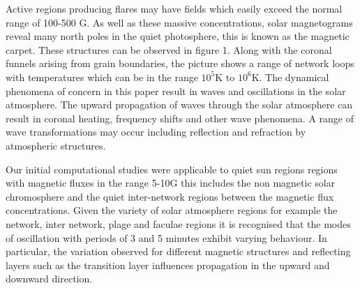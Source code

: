 \documentclass[linenumbers]{aastex63}
\begin{document}
Active regions producing flares may have fields which easily exceed the normal range of 100-500 G. As well as these massive concentrations, solar magnetograms reveal many north poles in the quiet photosphere, this is known as the magnetic carpet. These structures can be observed in figure 1. Along with the coronal funnels arising from grain boundaries, the picture shows a range of network loops with temperatures which can be in the range $10^{5}$K to $10^{6}$K. The dynamical phenomena of concern in this paper result in waves and oscillations in the solar atmosphere. The upward propagation of waves through the solar atmosphere can result in coronal heating, frequency shifts and other wave phenomena. A range of wave transformations may occur including reflection and refraction by atmospheric structures. 


Our initial computational studies were applicable to quiet sun regions regions with magnetic fluxes in the range 5-10G this includes the non magnetic solar chromosphere and the quiet inter-network regions between the magnetic flux concentrations. Given the variety of solar atmosphere regions for example the network, inter network, plage and faculae regions it is recognised that the modes of oscillation with periods of 3 and 5 minutes exhibit varying behaviour. In particular, the variation observed for different magnetic structures and reflecting layers such as the transition layer influences propagation in the upward and downward direction.



\end{document}
